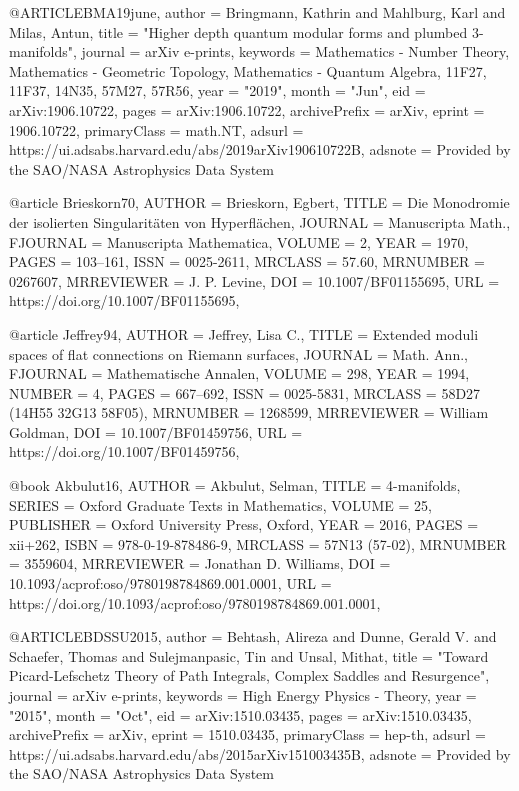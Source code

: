 @ARTICLE{BMA19june,
	author = {{Bringmann}, Kathrin and {Mahlburg}, Karl and {Milas}, Antun},
	title = "{Higher depth quantum modular forms and plumbed $3$-manifolds}",
	journal = {arXiv e-prints},
	keywords = {Mathematics - Number Theory, Mathematics - Geometric Topology, Mathematics - Quantum Algebra, 11F27, 11F37, 14N35, 57M27, 57R56},
	year = "2019",
	month = "Jun",
	eid = {arXiv:1906.10722},
	pages = {arXiv:1906.10722},
	archivePrefix = {arXiv},
	eprint = {1906.10722},
	primaryClass = {math.NT},
	adsurl = {https://ui.adsabs.harvard.edu/abs/2019arXiv190610722B},
	adsnote = {Provided by the SAO/NASA Astrophysics Data System}
}

@article {Brieskorn70,
    AUTHOR = {Brieskorn, Egbert},
     TITLE = {Die {M}onodromie der isolierten {S}ingularit\"{a}ten von
              {H}yperfl\"{a}chen},
   JOURNAL = {Manuscripta Math.},
  FJOURNAL = {Manuscripta Mathematica},
    VOLUME = {2},
      YEAR = {1970},
     PAGES = {103--161},
      ISSN = {0025-2611},
   MRCLASS = {57.60},
  MRNUMBER = {0267607},
MRREVIEWER = {J. P. Levine},
       DOI = {10.1007/BF01155695},
       URL = {https://doi.org/10.1007/BF01155695},
}

@article {Jeffrey94,
    AUTHOR = {Jeffrey, Lisa C.},
     TITLE = {Extended moduli spaces of flat connections on {R}iemann
              surfaces},
   JOURNAL = {Math. Ann.},
  FJOURNAL = {Mathematische Annalen},
    VOLUME = {298},
      YEAR = {1994},
    NUMBER = {4},
     PAGES = {667--692},
      ISSN = {0025-5831},
   MRCLASS = {58D27 (14H55 32G13 58F05)},
  MRNUMBER = {1268599},
MRREVIEWER = {William Goldman},
       DOI = {10.1007/BF01459756},
       URL = {https://doi.org/10.1007/BF01459756},
}

@book {Akbulut16,
    AUTHOR = {Akbulut, Selman},
     TITLE = {4-manifolds},
    SERIES = {Oxford Graduate Texts in Mathematics},
    VOLUME = {25},
 PUBLISHER = {Oxford University Press, Oxford},
      YEAR = {2016},
     PAGES = {xii+262},
      ISBN = {978-0-19-878486-9},
   MRCLASS = {57N13 (57-02)},
  MRNUMBER = {3559604},
MRREVIEWER = {Jonathan D. Williams},
       DOI = {10.1093/acprof:oso/9780198784869.001.0001},
       URL = {https://doi.org/10.1093/acprof:oso/9780198784869.001.0001},
}

@ARTICLE{BDSSU2015,
       author = {{Behtash}, Alireza and {Dunne}, Gerald V. and {Schaefer}, Thomas and
         {Sulejmanpasic}, Tin and {Unsal}, Mithat},
        title = "{Toward Picard-Lefschetz Theory of Path Integrals, Complex Saddles and Resurgence}",
      journal = {arXiv e-prints},
     keywords = {High Energy Physics - Theory},
         year = "2015",
        month = "Oct",
          eid = {arXiv:1510.03435},
        pages = {arXiv:1510.03435},
archivePrefix = {arXiv},
       eprint = {1510.03435},
 primaryClass = {hep-th},
       adsurl = {https://ui.adsabs.harvard.edu/abs/2015arXiv151003435B},
      adsnote = {Provided by the SAO/NASA Astrophysics Data System}
}

